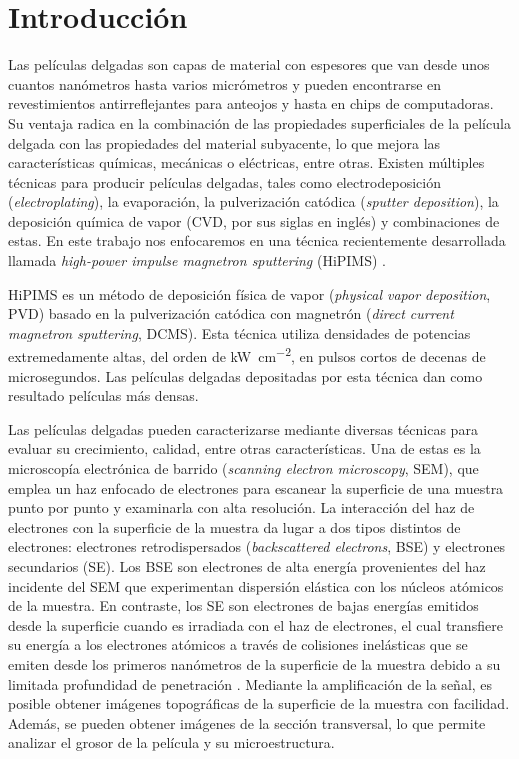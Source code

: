 \documentclass[12pt]{IEEEtran}
\begin{document}
\section{Introducción}
Las películas delgadas son capas de material con espesores que van desde unos cuantos nanómetros hasta varios micrómetros y pueden encontrarse en revestimientos antirreflejantes para anteojos y hasta en chips de computadoras. Su ventaja radica en la combinación de las propiedades superficiales de la película delgada con las propiedades del material subyacente, lo que mejora las características químicas, mecánicas o eléctricas, entre otras.
Existen múltiples técnicas para producir películas delgadas, tales como electrodeposición (\emph{electroplating}), la evaporación, la pulverización catódica (\emph{sputter deposition}), la deposición química de vapor  (CVD, por sus siglas en inglés) y combinaciones de estas. En este trabajo nos enfocaremos en una técnica recientemente desarrollada llamada \emph{high-power impulse magnetron sputtering} (HiPIMS) \cite{lundinHiPIMSProcess2010}.

HiPIMS es un método de deposición física de vapor (\emph{physical vapor deposition}, PVD) basado en la pulverización catódica con magnetrón (\emph{direct current magnetron sputtering}, DCMS). Esta técnica utiliza densidades de potencias extremedamente altas, del orden de \unit{\kW\per\cm^{2}}, en pulsos cortos de decenas de microsegundos. Las películas delgadas depositadas por esta técnica dan como resultado películas más densas.

Las películas delgadas pueden caracterizarse mediante diversas técnicas para evaluar su crecimiento, calidad, entre otras características. Una de estas es la microscopía electrónica de barrido (\emph{scanning electron microscopy}, SEM), que emplea un haz enfocado de electrones para escanear la superficie de una muestra punto por punto y examinarla con alta resolución.
La interacción del haz de electrones con la superficie de la muestra da lugar a dos tipos distintos de electrones: electrones retrodispersados (\emph{backscattered electrons}, BSE) y electrones secundarios (SE). Los BSE son electrones de alta energía provenientes del haz incidente del SEM que experimentan dispersión elástica con los núcleos atómicos de la muestra. En contraste, los SE son electrones de bajas energías emitidos desde la superficie cuando es irradiada con el haz de electrones, el cual transfiere su energía a los electrones atómicos a través de colisiones inelásticas que se emiten desde los primeros nanómetros de la superficie de la muestra debido a su limitada profundidad de penetración \cite{WhichElectronDetector2023,infoInterpretingImagesScanning2022}.
Mediante la amplificación de la señal, es posible obtener imágenes topográficas de la superficie de la muestra con facilidad. Además, se pueden obtener imágenes de la sección transversal, lo que permite analizar el grosor de la película y su microestructura.
\end{document}
